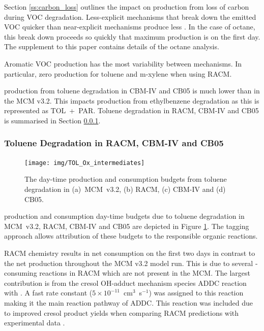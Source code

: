 Section \ref{ss:carbon_loss} outlines the impact on  production from loss of carbon during VOC degradation.
Less-explicit mechanisms that break down the emitted VOC quicker than near-explicit mechanisms produce less .
In the case of octane, this break down proceeds so quickly that maximum  production is on the first day. 
The supplement to this paper contains details of the octane analysis.

Aromatic VOC  production has the most variability between mechanisms. 
In particular, zero  production for toluene and m-xylene when using RACM.

 production from toluene degradation in CBM-IV and CB05 is much lower than in the MCM v3.2.
This impacts  production from ethylbenzene degradation as this is represented as \mbox{TOL + PAR}. 
Toluene degradation in RACM, CBM-IV and CB05 is summarised in Section \ref{sss:aromatic}.  

\subsubsection{Toluene Degradation in RACM, CBM-IV and CB05} \label{sss:aromatic}

\begin{figure}
    \begin{center}
        \texttt{[image: img/TOL\_Ox\_intermediates]}
    \end{center}
    \caption{The day-time  production and consumption budgets from toluene degradation in \mbox{(a) MCM v3.2}, (b) RACM, (c) CBM-IV and (d) CB05.}
    \label{f:toluene_Ox}
\end{figure}

 production and consumption day-time budgets due to toluene degradation in \mbox{MCM v3.2}, RACM, CBM-IV and CB05 are depicted in Figure \ref{f:toluene_Ox}. 
The tagging approach allows attribution of these budgets to the responsible organic reactions.

RACM chemistry results in net  consumption on the first two days in contrast to the net  production throughout the MCM v3.2 model run.
This is due to several -consuming reactions in RACM which are not present in the MCM.
The largest contribution is from the cresol OH-adduct mechanism species ADDC reaction with . 
A fast rate constant \mbox{($5 \times 10^{-11}$ cm$^3$ s$^{-1}$)} was assigned to this reaction making it the main reaction pathway of ADDC. 
This reaction was included due to improved cresol product yields when comparing RACM predictions with experimental data \citep{Stockwell:1997}.

